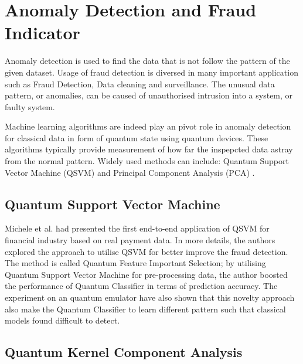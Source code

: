 \section{Anomaly Detection and Fraud Indicator} \label{Sec: Anomaly Detection and Fraud Indicator}

Anomaly detection is used to find the data that is not follow the pattern of the given dataset.
Usage of fraud detection is diversed in many important application such as Fraud Detection, Data cleaning and surveillance.
The unusual data pattern, or anomalies, can be caused of unauthorised intrusion into a system, or faulty system.

Machine learning algorithms are indeed play an pivot role in anomaly detection for classical data in form of quantum state using quantum devices.
These algorithms typically provide measurement of how far the inspepcted data astray from the normal pattern.
Widely used methods can include: Quantum Support Vector Machine (QSVM) \cite{grossiMixedQuantumClassical2022,kyriienkoUnsupervisedQuantumMachine2022} and Principal Component Analysis (PCA) \cite{guoQuantumAlgorithmsAnomaly2022, liuQuantumMachineLearning2018}.

\subsection{Quantum Support Vector Machine}
Michele et al. \cite{grossiMixedQuantumClassical2022} had presented the first end-to-end application of QSVM for financial industry based on real payment data.
In more details, the authors explored the approach to utilise QSVM for better improve the fraud detection.
The method is called Quantum Feature Important Selection; by utilising Quantum Support Vector Machine for pre-processing data, the author boosted the performance of Quantum Classifier in terms of prediction accuracy.
The experiment on an quantum emulator have also shown that this novelty approach also make the Quantum Classifier to learn different pattern such that classical models found difficult to detect.

\subsection{Quantum Kernel Component Analysis}